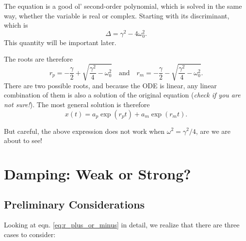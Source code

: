 \documentclass[11pt]{article}
\begin{document}
    The equation is a good ol' second-order polynomial, which is solved in
the same way, whether the variable is real or complex. Starting with its
discriminant, which is \begin{equation}
    \Delta = \gamma^2 - 4\omega_0^2.
\end{equation} This quantity will be important later.

    The roots are therefore \begin{equation}
    r_p = -\frac\gamma2 + \sqrt{\frac{\gamma^2}4 -\omega_0^2}\quad \textrm{and}\quad r_m = -\frac\gamma2 - \sqrt{\frac{\gamma^2}4 -\omega_0^2}.
    \label{eq:r_plus_or_minus}
\end{equation} There are two possible roots, and because the ODE is
linear, any linear combination of them is also a solution of the
original equation (\emph{check if you are not sure!}). The most general
solution is therefore \begin{equation}
    x(t) = a_p\exp(r_p t) + a_m\exp(r_mt).
    \label{eq:gensol}
\end{equation}

But careful, the above expression does not work when
\(\omega^2 = \gamma^2/4\), are we are about to see!

    \hypertarget{damping-weak-or-strong}{%
\section{Damping: Weak or Strong?}\label{damping-weak-or-strong}}

    \hypertarget{preliminary-considerations}{%
\subsection{Preliminary
Considerations}\label{preliminary-considerations}}

    Looking at eqn. \eqref{eq:r_plus_or_minus} in detail, we realize that
there are three cases to consider:
\end{document}
